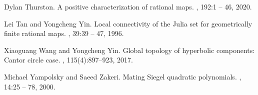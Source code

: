 \documentclass[11pt, reqno]{amsart}
\numberwithin{equation}{section}
\theoremstyle{plain}
\theoremstyle{theorem}
\theoremstyle{definition}
\numberwithin{figure}{section}
\begin{document}
\begin{thebibliography}{DPWY20}
Dylan Thurston.
\newblock A positive characterization of rational maps.
, 192:1 -- 46, 2020.

Lei Tan and Yongcheng Yin.
\newblock Local connectivity of the Julia set for geometrically finite rational
  maps.
, 39:39 -- 47, 1996.

Xiaoguang Wang and Yongcheng Yin.
\newblock Global topology of hyperbolic components: Cantor circle case.
,
  115(4):897--923, 2017.

Michael Yampolsky and Saeed Zakeri.
\newblock Mating {Siegel} quadratic polynomials.
, 14:25 -- 78,
  2000.

\end{thebibliography}
\end{document}
